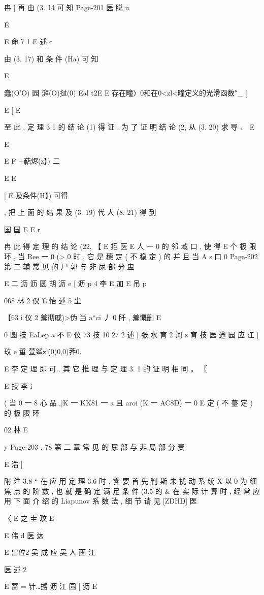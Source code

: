 {{{{{{{{{{{{{{{冉
[
再 由 (3. 14 可 知
Page-201
医 脱 u

E

E 命 7 1 E 述 c

由 (3. 17) 和 条 件 (Ha) 可 知

E

蠢(O'O) 园 湃(O)挝(0) Eal t2E
E 存在疃〉0和在0<zl<疃定义的光滑函数″_
[

E [ E

至 此 , 定 理 3 1 的 结 论 (1) 得 证 . 为 了 证 明 结 论 (2, 从 (3. 20) 求 导 、
E

E

E
F +萜烬(z】) 二

E
E

[
E 及条件(H】) 可得

, 把 上 面 的 结 果 及 (3. 19) 代 人 (8. 21) 得 到

国 国 E
E r

冉 此 得 定 理 的 结 论 (22, 【
E 招 医
E 人
一 0 的 邻 域 口 , 使 得
E
个 极 限 环 , 当 Ree 一 0 (> 0 时 , 它 是 穗 定 ( 不 稳 定 ) 的 并 且 当 A
s 口
0
Page-202
第 二 辅 常 见 的 尸 郭 与 非 尿 部 分 盅

E 二 沥 沥 圆 胡 沥
e
[ 沥 p 4 李
E 加
E 吊 p

068 林 2 仪
E 怡 述
5 尘

【63 i 仪 2 羞彻戚)>伪 当 a“ci 丿 0 阡 , 羞慨删
E

0 圆 技
EaLep a 不
E 仪 73 技 10 27 2 述
[ 张 水 育 2 河 z 育 技
医 途 园 应 江 [

玟
e
蜇 萱鲨z'(0)0,0)荠0.

E 李
定 理 即 可 . 其 它 推 理 与 定 理 3. 1 的 证 明 相 同 。 〖

E 技 李
i

( 当 0 一 8 心 品 ,|K 一 KK81 一 a 且 aroi (K 一 AC8D) 一 0
E
定 ( 不 薹 定 ) 的 极 限 环

02 林
E

y
Page-203
. 78 第 二 章 常 见 的 尿 部 与 非 局 部 分 责

E 浩 ]

附 注 3.8 “ 在 应 用 定 理 3.6 时 , 霁 要 首 先 判 斯 未 扰 动 系 统 X
以 0 为 细 焦 点 的 阶 数 , 也 就 是 确 定 满 足 条 件 (3.5 的 & 在 实 际 计
算 时 , 经 常 应 用 下 面 介 绍 的 Liapunov 系 数 法 , 细 节 请 见 [ZDHD]
医

〈 E 之 圭 玟
E

E 伟 d
医 达

E 兽位2 吴 成 应 吴 人 画 江

医 述 2

E
蔷 = 针…掳 沥 江 园 [ 沥
E

}}}}}}}}}}}}}}}
